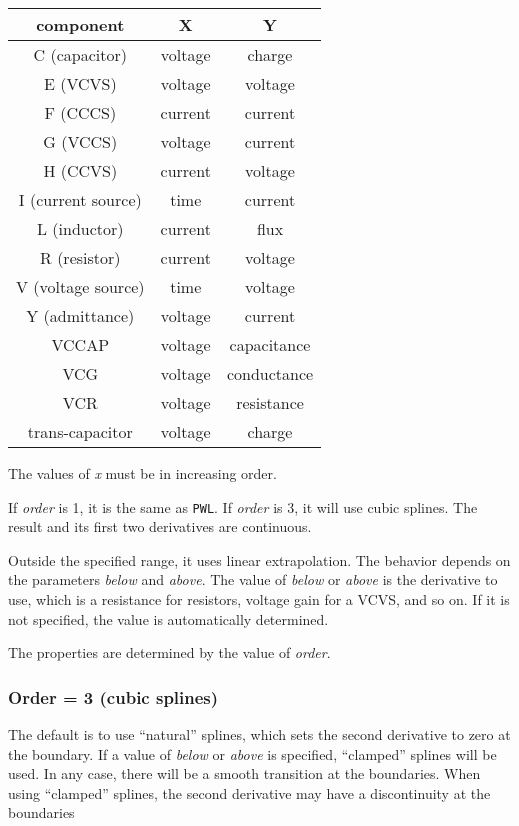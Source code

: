 \begin{tabular}{|c|c|c|}
\hline 
component	&X		&Y		\\\hline\hline 
C (capacitor)	&voltage	&charge 	\\\hline 
E (VCVS)	&voltage	&voltage	\\\hline
F (CCCS)	&current	&current	\\\hline 
G (VCCS)	&voltage	&current	\\\hline 
H (CCVS)	&current	&voltage	\\\hline 
I (current source) &time	&current	\\\hline
L (inductor)	&current	&flux		\\\hline
R (resistor)	&current	&voltage	\\\hline
V (voltage source) &time	&voltage	\\\hline
Y (admittance)	&voltage	&current	\\\hline
VCCAP		&voltage	&capacitance	\\\hline 
VCG		&voltage	&conductance	\\\hline 
VCR		&voltage	&resistance	\\\hline 
trans-capacitor	&voltage	&charge		\\\hline 
\end{tabular}

The values of {\it x} must be in increasing order.

If {\em order} is 1, it is the same as {\tt PWL}.  If {\em order} is
3, it will use cubic splines.  The result and its first two
derivatives are continuous.

Outside the specified range, it uses linear extrapolation.  The
behavior depends on the parameters {\em below} and {\em above}.  The
value of {\em below} or {\em above} is the derivative to use, which
is a resistance for resistors, voltage gain for a VCVS, and so on.  If 
it is not specified, the value is automatically determined.

The properties are determined by the value of {\em order}.

\subsubsection{Order = 3 (cubic splines)}

The default is to use ``natural'' splines, which sets the second
derivative to zero at the boundary.  If a value of {\em below} or
{\em above} is specified, ``clamped'' splines will be used.  In any
case, there will be a smooth transition at the boundaries.  When using
``clamped'' splines, the second derivative may have a discontinuity at
the boundaries

